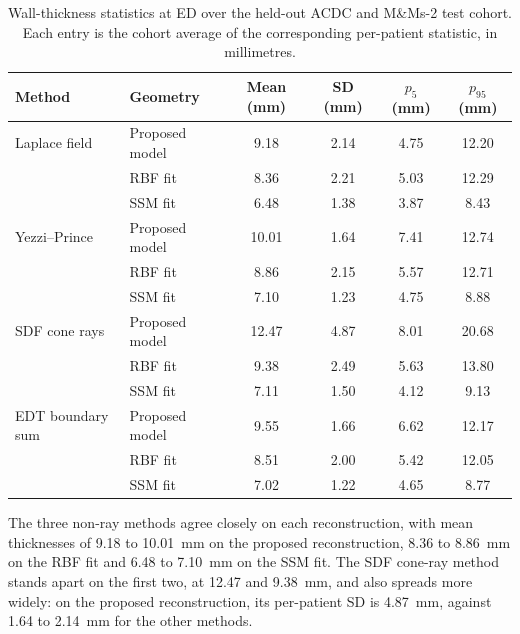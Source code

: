 \begin{table}[H]
  \centering
  \caption[ED wall-thickness statistics]{Wall-thickness statistics at ED over the held-out ACDC and
    M\&Ms-2 test cohort. Each entry is the cohort average of the corresponding
    per-patient statistic, in millimetres.}
  \label{tab:wall-thickness-results}
  \thesistablestyle
  \begin{tabular*}{\textwidth}{@{\extracolsep{\fill}}l l c c c c@{}}
    \toprule
    \textbf{Method} & \textbf{Geometry} & \textbf{Mean (mm)}
      & \textbf{SD (mm)} & \textbf{$p_{5}$ (mm)} & \textbf{$p_{95}$ (mm)} \\
    \midrule
      Laplace field    & Proposed model &  9.18 & 2.14 & 4.75 & 12.20 \\
                       & RBF fit &  8.36 & 2.21 & 5.03 & 12.29 \\
                       & SSM fit &  6.48 & 1.38 & 3.87 &  8.43 \\
      \addlinespace
      Yezzi--Prince    & Proposed model & 10.01 & 1.64 & 7.41 & 12.74 \\
               & RBF fit &  8.86 & 2.15 & 5.57 & 12.71 \\
               & SSM fit &  7.10 & 1.23 & 4.75 &  8.88 \\
      \addlinespace
      SDF cone rays    & Proposed model & 12.47 & 4.87 & 8.01 & 20.68 \\
                       & RBF fit &  9.38 & 2.49 & 5.63 & 13.80 \\
                       & SSM fit &  7.11 & 1.50 & 4.12 &  9.13 \\
      \addlinespace
      EDT boundary sum & Proposed model &  9.55 & 1.66 & 6.62 & 12.17 \\
                       & RBF fit &  8.51 & 2.00 & 5.42 & 12.05 \\
                       & SSM fit &  7.02 & 1.22 & 4.65 &  8.77 \\
    \bottomrule
  \end{tabular*}
\end{table}

The three non-ray methods agree closely on each reconstruction, with mean
thicknesses of 9.18 to 10.01~mm on the proposed reconstruction, 8.36 to
8.86~mm on the RBF fit and 6.48 to 7.10~mm on the SSM fit. The SDF
cone-ray method stands apart on the first two, at 12.47 and 9.38~mm, and
also spreads more widely: on the proposed reconstruction, its per-patient SD is
4.87~mm, against 1.64 to 2.14~mm for the other methods.

